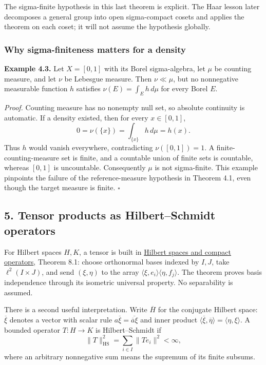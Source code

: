 \documentclass[
  english,
  11pt,
  a4paper,
]{article}
\newcounter{none} %
\begin{document}
The sigma-finite hypothesis in this last theorem is explicit. The Haar
lesson later decomposes a general group into open sigma-compact cosets
and applies the theorem on each coset; it will not assume the hypothesis
globally.

\subsubsection{Why sigma-finiteness matters for a
density}\label{measure-and-hilbert-space-tools--radon-nikodym-countability}

\textbf{Example 4.3.} Let \(X=[0,1]\) with its Borel sigma-algebra, let
\(\mu\) be counting measure, and let \(\nu\) be Lebesgue measure. Then
\(\nu\ll\mu\), but no nonnegative measurable function \(h\) satisfies
\(\nu(E)=\int_Eh\,d\mu\) for every Borel \(E\).

\emph{Proof.} Counting measure has no nonempty null set, so absolute
continuity is automatic. If a density existed, then for every
\(x\in[0,1]\), \[0=\nu(\{x\})=\int_{\{x\}}h\,d\mu=h(x).\] Thus \(h\)
would vanish everywhere, contradicting \(\nu([0,1])=1\). A
finite-counting-measure set is finite, and a countable union of finite
sets is countable, whereas \([0,1]\) is uncountable. Consequently
\(\mu\) is not sigma-finite. This example pinpoints the failure of the
reference-measure hypothesis in Theorem 4.1, even though the target
measure is finite. \(\square\)

\subsection{5. Tensor products as Hilbert--Schmidt
operators}\label{measure-and-hilbert-space-tools--5-tensor-products-as-hilbert-schmidt-operators}

For Hilbert spaces \(H,K\), a tensor is built in
\hyperref[hilbert-spaces-and-compact-operators]{Hilbert spaces and
compact operators}, Theorem 8.1: choose orthonormal bases indexed by
\(I,J\), take \(\ell^2(I\times J)\), and send \((\xi,\eta)\) to the
array \(\langle\xi,e_i\rangle\langle\eta,f_j\rangle\). The theorem
proves basis independence through its isometric universal property. No
separability is assumed.

There is a second useful interpretation. Write \(\overline H\) for the
conjugate Hilbert space: \(\overline\xi\) denotes a vector with scalar
rule \(a\overline\xi=\overline{\overline a\xi}\) and inner product
\(\langle\overline\xi,\overline\eta\rangle=\langle\eta,\xi\rangle\). A
bounded operator \(T:H\to K\) is Hilbert--Schmidt if
\[\|T\|_{\mathrm{HS}}^2=\sum_{i\in I}\|Te_i\|^2<\infty,\] where an
arbitrary nonnegative sum means the supremum of its finite subsums.
\end{document}
